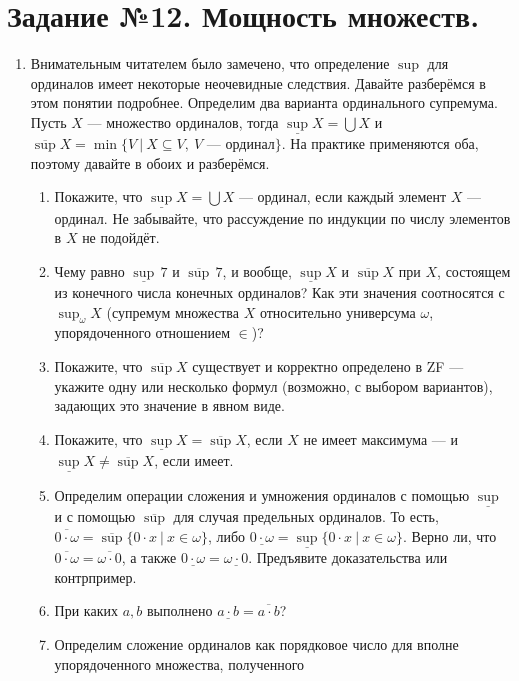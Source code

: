 \documentclass[10pt,a4paper,oneside]{article}
\begin{document}
\section*{Задание №12. Мощность множеств.}

\begin{enumerate}
\item Внимательным читателем было замечено, что определение $\sup$ для ординалов имеет некоторые неочевидные следствия.
Давайте разберёмся в этом понятии подробнее.
Определим два варианта ординального супремума. Пусть $X$ --- множество ординалов, тогда $\underline{\sup} X = \bigcup X$ и 
$\overline{\sup} X = \min \{ V\ |\ X \subseteq V,\ V \text{ --- ординал} \}$. На практике применяются оба, поэтому давайте 
в обоих и разберёмся.
\begin{enumerate}
\item Покажите, что $\underline{\sup} X = \bigcup X$ --- ординал, если каждый элемент $X$ --- ординал. Не забывайте, что
рассуждение по индукции по числу элементов в $X$ не подойдёт.
\item Чему равно $\underline{\sup}\,7$ и $\overline{\sup}\,7$, и вообще, $\underline{\sup}X$ и $\overline{\sup}X$ при $X$, 
состоящем из конечного числа конечных ординалов? 
Как эти значения соотносятся с $\sup_\omega X$ (супремум множества $X$ относительно универсума $\omega$, упорядоченного отношением $\in$)?
\item Покажите, что $\overline{\sup} X$ существует и корректно определено в ZF --- укажите одну или несколько формул (возможно, с выбором вариантов), 
задающих это значение в явном виде.
\item Покажите, что $\underline{\sup} X = \overline{\sup} X$, если $X$ не имеет максимума --- и $\underline{\sup} X \ne \overline{\sup} X$, если имеет.
\item Определим операции сложения и умножения ординалов с помощью $\underline{\sup}$ и с помощью $\overline{\sup}$ для случая предельных ординалов.
То есть, $\overline{0\cdot\omega} = \overline{\sup}\{0 \cdot x\ |\ x \in \omega\}$, либо $\underline{0\cdot\omega} = \underline{\sup}\{0 \cdot x\ |\ x \in \omega\}$.
Верно ли, что $\overline{0\cdot\omega} = \overline{\omega\cdot 0}$, а также $\underline{0\cdot\omega} = \underline{\omega\cdot 0}$. 
Предъявите доказательства или контрпример.
\item При каких $a,b$ выполнено $\underline{a \cdot b} = \overline{a \cdot b}$?
\item Определим сложение ординалов как порядковое число для вполне упорядоченного множества, полученного

\end{enumerate}
\end{enumerate}
\end{document}
